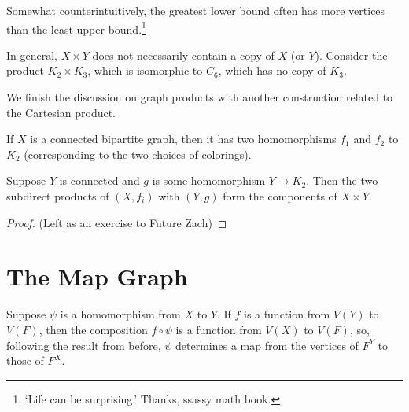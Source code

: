 Somewhat counterintuitively, the greatest lower bound often has more vertices than the least upper bound.\footnote{`Life can be surprising.' Thanks, ssassy math book.}


In general, $X\times Y$ does not necessarily contain a copy of $X$ (or $Y$).  Consider the product $K_2\times K_3$, which is isomorphic to $C_6$, which has no copy of $K_3$.

We finish the discussion on graph products with another construction related to the Cartesian product.


If $X$ is a connected bipartite graph, then it has two homomorphisms $f_1$ and $f_2$ to $K_2$ (corresponding to the two choices of colorings).  

\begin{claim}
	
Suppose $Y$ is connected and $g$ is some homomorphism $Y\rightarrow K_2$.  Then the two subdirect products of $(X,f_i)$ with $(Y,g)$ form the components of $X\times Y$.
\end{claim}
\begin{proof}
	(Left as an exercise to Future Zach)
\end{proof}

\section*{The Map Graph}

Suppose $\psi$ is a homomorphism from $X$ to $Y$.   If $f$ is a function from $V(Y)$ to $V(F)$, then the composition $f\circ \psi$ is a function from $V(X)$ to $V(F)$, so, following the result from before, $\psi$ determines a map from the vertices of $F^Y$ to those of $F^X$.

